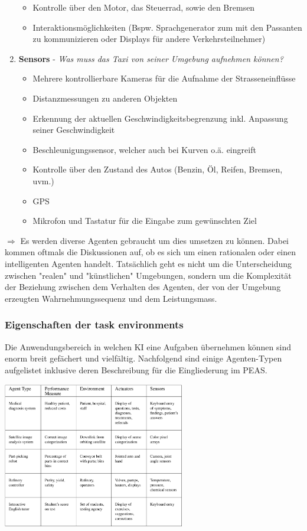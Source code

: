 \documentclass{article}
\newenvironment{Figure}
	{\par\medskip\noindent\minipage{\linewidth}}
	{\endminipage\par\medskip}
\theoremstyle{merke}
\theoremstyle{definition}
\begin{document}
\begin{enumerate}
\begin{itemize}
\item Kontrolle über den Motor, das Steuerrad, sowie den Bremsen
\item Interaktionsmöglichkeiten (Bspw. Sprachgenerator zum mit den Passanten zu kommunizieren oder Displays für andere Verkehrsteilnehmer)
\end{itemize}
\item \textbf{Sensors} - \textit{Was muss das Taxi von seiner Umgebung aufnehmen können?}
\begin{itemize}
\item Mehrere kontrollierbare Kameras für die Aufnahme der Strasseneinflüsse
\item Distanzmessungen zu anderen Objekten
\item Erkennung der aktuellen Geschwindigkeitsbegrenzung inkl. Anpassung seiner Geschwindigkeit
\item Beschleunigungssensor, welcher auch bei Kurven o.ä. eingreift
\item Kontrolle über den Zustand des Autos (Benzin, Öl, Reifen, Bremsen, uvm.)
\item GPS
\item Mikrofon und Tastatur für die Eingabe zum gewünschten Ziel
\end{itemize}
\end{enumerate}
$\Rightarrow$ Es werden diverse Agenten gebraucht um dies umsetzen zu können. Dabei kommen oftmals die Diskussionen auf, ob es sich um einen rationalen oder einen intelligenten Agenten handelt. Tatsächlich geht es nicht um die Unterscheidung zwischen "realen" und "künstlichen" Umgebungen, sondern um die Komplexität der Beziehung zwischen dem Verhalten des Agenten, der von der Umgebung erzeugten Wahrnehmungssequenz und dem Leistungsmass.

\subsubsection{Eigenschaften der task environments}
Die Anwendungsbereich in welchen KI eine Aufgaben übernehmen können sind enorm breit gefächert und vielfältig. Nachfolgend sind einige Agenten-Typen aufgelistet inklusive deren Beschreibung für die Eingliederung im PEAS.

\begin{Figure}
\centering
\includegraphics[width=300px]{img/AgentTypes.png}
	\label{fig:Beispiele von AgentenTypen und deren PEAS Beschreibung}
\end{Figure}
\end{document}
